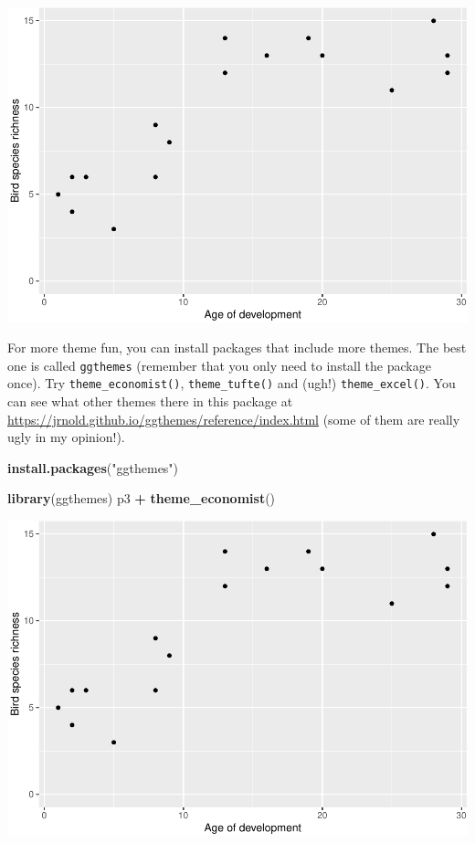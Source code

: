 \documentclass[
  a4paperpaper,
]{book}
\newenvironment{Shaded}{\begin{snugshade}}{\end{snugshade}}
\newcommand{\KeywordTok}[1]{\textcolor[rgb]{0.13,0.29,0.53}{\textbf{#1}}}
\newcommand{\NormalTok}[1]{#1}
\newcommand{\OperatorTok}[1]{\textcolor[rgb]{0.81,0.36,0.00}{\textbf{#1}}}
\newcommand{\StringTok}[1]{\textcolor[rgb]{0.31,0.60,0.02}{#1}}
\begin{document}
\begin{center}\includegraphics{BB852_files/figure-latex/unnamed-chunk-122-1} \end{center}

For more theme fun, you can install packages that include more themes. The best one is called \texttt{ggthemes} (remember that you only need to install the package once). Try \texttt{theme\_economist()}, \texttt{theme\_tufte()} and (ugh!) \texttt{theme\_excel()}. You can see what other themes there in this package at \url{https://jrnold.github.io/ggthemes/reference/index.html} (some of them are really ugly in my opinion!).

\begin{Shaded}
\begin{Highlighting}[]
\KeywordTok{install.packages}\NormalTok{(}\StringTok{"ggthemes"}\NormalTok{)}
\end{Highlighting}
\end{Shaded}

\begin{Shaded}
\begin{Highlighting}[]
\KeywordTok{library}\NormalTok{(ggthemes)}
\NormalTok{p3 }\OperatorTok{+}\StringTok{ }
\StringTok{  }\KeywordTok{theme\_economist}\NormalTok{()}
\end{Highlighting}
\end{Shaded}

\begin{center}\includegraphics{BB852_files/figure-latex/unnamed-chunk-124-1} \end{center}
\end{document}
